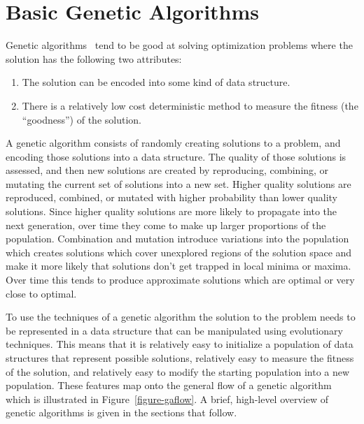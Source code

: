 \section{Basic Genetic Algorithms}

Genetic algorithms~\cite{Holland1992, goldberg1989genetic,
fogel2000evolutionary, haupt2004practical} tend to be good at solving
optimization problems where the solution has the following two attributes:

\begin{enumerate}
  \item {The solution can be encoded into some kind of data structure.}
  \item {There is a relatively low cost deterministic method to measure the
  fitness (the ``goodness'') of the solution.}
\end{enumerate}

A genetic algorithm consists of randomly creating solutions to a problem, and
encoding those solutions into a data structure. The quality of those solutions
is assessed, and then new solutions are created by reproducing, combining, or
mutating the current set of solutions into a new set. Higher quality solutions
are reproduced, combined, or mutated with higher probability than lower quality
solutions. Since higher quality solutions are more likely to propagate into the
next generation, over time they come to make up larger proportions of the
population. Combination and mutation introduce variations into the population
which creates solutions which cover unexplored regions of the solution space and
make it more likely that solutions don't get trapped in local minima or maxima.
Over time this tends to produce approximate solutions which are optimal or very
close to optimal.

To use the techniques of a genetic algorithm the solution to the problem needs
to be represented in a data structure that can be manipulated using evolutionary
techniques. This means that it is relatively easy to initialize a population of
data structures that represent possible solutions, relatively easy to measure
the fitness of the solution, and relatively easy to modify the starting
population into a new population. These features map onto the general flow of a
genetic algorithm which is illustrated in Figure~\ref{figure-gaflow}. A brief,
high-level overview of genetic algorithms is given in the sections that follow.

